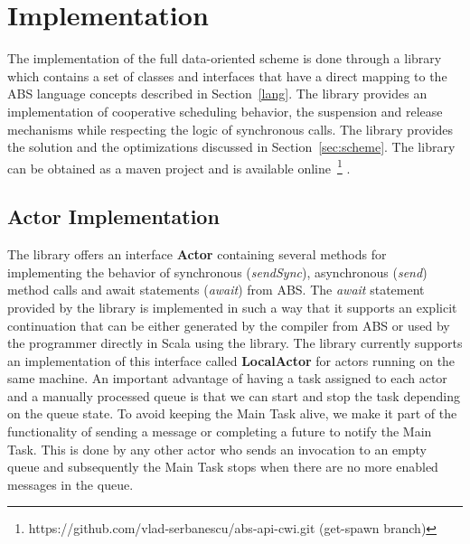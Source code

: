 \section{Implementation}
\label{run}
The implementation of the full data-oriented scheme is done through a library which contains a set of classes and interfaces that have a direct mapping to the ABS language concepts described in Section~\ref{lang}. The library provides an implementation of cooperative scheduling behavior, the suspension and release mechanisms while respecting the logic of synchronous calls. The library provides the solution and the optimizations discussed in Section~\ref{sec:scheme}. The library can be obtained as a maven project and is available online~\footnote{https://github.com/vlad-serbanescu/abs-api-cwi.git (get-spawn branch)} .



%

\subsection{Actor Implementation}
The library offers an interface \textbf{Actor} containing several methods for implementing the behavior of synchronous (\textit{sendSync}), asynchronous (\textit{send}) method calls and await statements (\textit{await}) from ABS. The \textit{await} statement provided by the library is implemented in such a way that it supports an explicit continuation that can be either generated by the compiler from ABS or used by the programmer directly in Scala using the library.  The library currently supports an implementation of this interface called \textbf{LocalActor} for actors running on the same machine. An important advantage of having a task assigned to each actor and a manually processed queue is that we can start and stop the task depending on the queue state. To avoid keeping the Main Task alive, we make it part of the functionality of sending a message or completing a future to notify the Main Task. This is done by any other actor who sends an invocation to an empty queue and subsequently the Main Task stops when there are no more enabled messages in the queue. 

